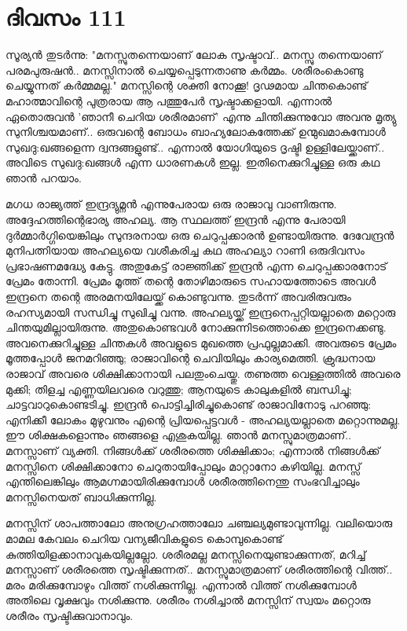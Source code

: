 \newpage
\section{ദിവസം 111}


സൂര്യന്‍ തുടര്‍ന്നു: "മനസ്സുതന്നെയാണ്‌ ലോക സൃഷ്ടാവ്‌.. മനസ്സു തന്നെയാണ്‌ പരമപുരുഷന്‍.. മനസ്സിനാല്‍ ചെയ്യപ്പെടുന്നതാണു കര്‍മ്മം. ശരീരംകൊണ്ടു ചെയ്യുന്നത്‌ കര്‍മ്മമല്ല." മനസ്സിന്റെ ശക്തി നോക്കൂ! ദൃഢമായ ചിന്തകൊണ്ട്‌ മഹാത്മാവിന്റെ പുത്രരായ ആ പത്തുപേര്‍ സൃഷ്ടാക്കളായി. എന്നാല്‍ ഏതൊരുവന്‍ 'ഞാനീ ചെറിയ ശരീരമാണ്‌' എന്നു ചിന്തിക്കുന്നുവോ അവനു മൃത്യു സുനിശ്ചയമാണ്‌.. ഒരുവന്റെ ബോധം ബാഹ്യലോകത്തേക്ക്‌ ഉന്മുഖമാകുമ്പോള്‍ സുഖദു:ഖങ്ങളെന്ന ദ്വന്ദങ്ങളുണ്ട്‌.. എന്നാല്‍ യോഗിയുടെ ദൃഷ്ടി ഉള്ളിലേയ്ക്കാണ്‌.. അവിടെ സുഖദു:ഖങ്ങള്‍ എന്ന ധാരണകള്‍ ഇല്ല. ഇതിനെക്കുറിച്ചുള്ള ഒരു കഥ ഞാന്‍ പറയാം.

മഗധ രാജ്യത്ത്‌ ഇന്ദ്രദ്യുമ്നന്‍ എന്നുപേരായ ഒരു രാജാവു വാണിരുന്നു. അദ്ദേഹത്തിന്റെഭാര്യ അഹല്യ. ആ സ്ഥലത്ത്‌ ഇന്ദ്രന്‍ എന്നു പേരായി ദുര്‍മ്മാര്‍ഗ്ഗിയെങ്കിലും സുന്ദരനായ ഒരു ചെറുപ്പക്കാരന്‍ ഉണ്ടായിരുന്നു. ദേവേന്ദ്രന്‍ മുനിപത്നിയായ അഹല്യയെ വശീകരിച്ച കഥ അഹല്യാ റാണി ഒരുദിവസം പ്രഭാഷണമദ്ധ്യേ കേട്ടു. അതുകേട്ട്‌ രാജ്ഞിക്ക്‌ ഇന്ദ്രന്‍ എന്ന ചെറുപ്പക്കാരനോട്‌ പ്രേമം തോന്നി. പ്രേമം മൂത്ത്‌ തന്റെ തോഴിമാരുടെ സഹായത്തോടെ അവള്‍ ഇന്ദ്രനെ തന്റെ അരമനയിലേയ്ക്ക്‌ കൊണ്ടുവന്നു. തുടര്‍ന്ന് അവരിരുവരും രഹസ്യമായി സന്ധിച്ചു സുഖിച്ചു വന്നു. അഹല്യയ്ക്ക്‌ ഇന്ദ്രനെപ്പറ്റിയല്ലാതെ മറ്റൊരു ചിന്തയുമില്ലായിരുന്നു. അതുകൊണ്ടവള്‍ നോക്കുന്നിടത്തൊക്കെ ഇന്ദ്രനെക്കണ്ടു. അവനെക്കുറിച്ചുള്ള ചിന്തകള്‍ അവളുടെ മുഖത്തെ പ്രഫുല്ലമാക്കി. അവരുടെ പ്രേമം മൂത്തപ്പോള്‍ ജനമറിഞ്ഞു; രാജാവിന്റെ ചെവിയിലും കാര്യമെത്തി. ക്രുദ്ധനായ രാജാവ്‌ അവരെ ശിക്ഷിക്കാനായി പലതുംചെയ്തു. തണുത്ത വെള്ളത്തില്‍ അവരെ മുക്കി; തിളച്ച എണ്ണയിലവരെ വറുത്തു; ആനയുടെ കാലുകളില്‍ ബന്ധിച്ചു; ചാട്ടവാറുകൊണ്ടടിച്ചു. ഇന്ദ്രന്‍ പൊട്ടിച്ചിരിച്ചുകൊണ്ട്‌ രാജാവിനോടു പറഞ്ഞു: എനിക്കീ ലോകം മുഴുവനും എന്റെ പ്രിയപ്പെട്ടവള്‍ - അഹല്യയല്ലാതെ മറ്റൊന്നുമല്ല. ഈ ശിക്ഷകളൊന്നും ഞങ്ങളെ എശുകയില്ല. ഞാന്‍ മനസ്സുമാത്രമാണ്‌.. മനസ്സാണ്‌ വ്യക്തി. നിങ്ങള്‍ക്ക്‌ ശരീരത്തെ ശിക്ഷിക്കാം; എന്നാല്‍ നിങ്ങള്‍ക്ക്‌ മനസ്സിനെ ശിക്ഷിക്കാനോ ചെറുതായിപ്പോലും മാറ്റാനോ കഴിയില്ല. മനസ്സ്‌ എന്തിലെങ്കിലും ആമഗ്നമായിരിക്കുമ്പോള്‍ ശരീരത്തിനെന്തു സംഭവിച്ചാലും മനസ്സിനെയത്‌ ബാധിക്കുന്നില്ല.

മനസ്സിന്‌ ശാപത്താലോ അനുഗ്രഹത്താലോ ചഞ്ചല്യമുണ്ടാവുന്നില്ല. വലിയൊരു മാമല കേവലം ചെറിയ വന്യജീവികളുടെ കൊമ്പുകൊണ്ട്‌ കുത്തിയിളക്കാനാവുകയില്ലല്ലോ. ശരീരമല്ല മനസ്സിനെയുണ്ടാക്കുന്നത്‌, മറിച്ച്‌ മനസ്സാണ്‌ ശരീരത്തെ സൃഷ്ടിക്കുന്നത്‌.. മനസ്സുമാത്രമാണ്‌ ശരീരത്തിന്റെ വിത്ത്‌.. മരം മരിക്കുമ്പോഴും വിത്ത്‌ നശിക്കുന്നില്ല. എന്നാല്‍ വിത്ത്‌ നശിക്കുമ്പോള്‍ അതിലെ വൃക്ഷവും നശിക്കുന്നു. ശരീരം നശിച്ചാല്‍ മനസ്സിന്‌ സ്വയം മറ്റൊരു ശരീരം സൃഷ്ടിക്കുവാനാവും. 

